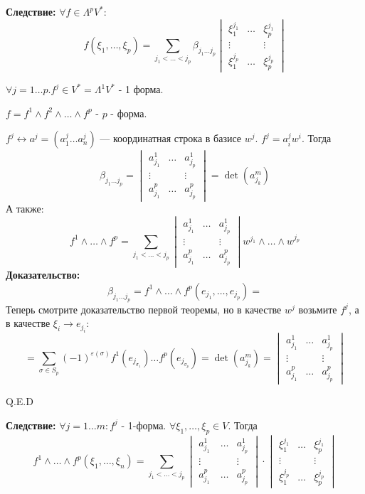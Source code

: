 \textbf{Следствие:} $\forall f \in \Lambda^p V^*$:
$$f(\xi_1, \ldots,\xi_p)=\sum\limits_{j_1<\ldots<j_p}\beta_{j_1\ldots j_p} \begin{vmatrix}
\xi_1^{j_1}&\ldots& \xi_p^{j_1}\\
\vdots & & \vdots \\
\xi_1^{j_p} & \ldots & \xi_p^{j_p}
\end{vmatrix}$$ 


$\forall j = 1\ldots p. f^j \in V^* = \Lambda^1V^*$ - 1 форма.

$f= f^1 \wedge f^2 \wedge \ldots \wedge f^p$ - $p$ - форма.

$f^j \leftrightarrow a^j = (a_1^j \ldots a_n^j)$ --- координатная строка в базисе $w^j$. $f^j= a_i^j w^i$. Тогда 
$$\beta_{j_1\ldots j_p}= \begin{vmatrix}
    a_{j_1}^1 & \ldots & a_{j_p}^{1}\\
    \vdots & & \vdots \\
    a_{j_1}^p & \ldots & a_{j_p}^p
\end{vmatrix} = \det (a_{j_k}^m)$$
А также: 
$$f^1 \wedge \ldots \wedge f^p = \sum\limits_{j_1 < \ldots < j_p}\begin{vmatrix}
    a_{j_1}^1 & \ldots & a_{j_p}^1 \\
    \vdots & & \vdots \\
    a^p_{j_1} & \ldots & a_{j_p}^p 
\end{vmatrix} w^{j_1}\wedge \ldots \wedge w^{j_p}$$
\textbf{Доказательство:}
$$\beta_{j_1\ldots j_p}= f^1\wedge \ldots \wedge f^p (e_{j_1},\ldots, e_{j_p})=$$
Теперь смотрите доказательство первой теоремы, но в качестве $w^j$ возьмите $f^j$, а в качестве $\xi_i \rightarrow e_{j_i}$:
$$= \sum\limits_{\sigma \in S_p} (-1)^{\varepsilon(\sigma)}f^1(e_{j_{\sigma_1}})\ldots f^p(e_{j_{\sigma_p}}) = \det (a_{j_{k}}^m) = \begin{vmatrix}
    a_{j_1}^1 & \ldots & a_{j_p}^1\\
    \vdots & & \vdots \\
    a_{j_1}^p & \ldots & a_{j_p}^p
\end{vmatrix} $$

\hfill Q.E.D


\textbf{Следствие:} $\forall j = 1\ldots m: f^j$ - 1-форма. $\forall \xi_1,\ldots, \xi_p \in V$. Тогда
$$f^1 \wedge \ldots \wedge f^p (\xi_1,\ldots, \xi_n) = \sum\limits_{j_1 < \ldots < j_p} \begin{vmatrix} a_{j_1}^1\ & \ldots & a_{j_p}^1 \\
\vdots & & \vdots \\
a_{j_1}^p & \ldots & a_{j_p}^{p}
\end{vmatrix}\cdot \begin{vmatrix}
\xi_1^{j_1} & \ldots & \xi_p^{j_1}\\
\vdots & & \vdots \\
\xi_{1}^{j_p} & \ldots  &  \xi_p^{j_p}
\end{vmatrix}$$

